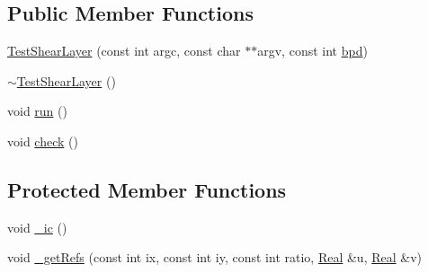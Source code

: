 \subsection*{Public Member Functions}
\begin{DoxyCompactItemize}
\item 
\hyperlink{class_test_shear_layer_abbd18fb0fe2ccbfae087969f88d9e298}{Test\+Shear\+Layer} (const int argc, const char $\ast$$\ast$argv, const int \hyperlink{class_test_shear_layer_aa786becaa4125bd36246994a2243359a}{bpd})
\item 
\hyperlink{class_test_shear_layer_a7ba44bb0bed57b11c0ab24911d6e59a0}{$\sim$\+Test\+Shear\+Layer} ()
\item 
void \hyperlink{class_test_shear_layer_a87f2660d386c5929d05d273c8da364b5}{run} ()
\item 
void \hyperlink{class_test_shear_layer_a6dfb988e9681fac674fd366d3de1efea}{check} ()
\end{DoxyCompactItemize}
\subsection*{Protected Member Functions}
\begin{DoxyCompactItemize}
\item 
void \hyperlink{class_test_shear_layer_adad87d4705869cb6bb80fc7c4bf90307}{\+\_\+ic} ()
\item 
void \hyperlink{class_test_shear_layer_a456b851404822229eb9593fb950c01c6}{\+\_\+get\+Refs} (const int ix, const int iy, const int ratio, \hyperlink{_h_d_f5_dumper_8h_a445a5f0e2a34c9d97d69a3c2d1957907}{Real} \&u, \hyperlink{_h_d_f5_dumper_8h_a445a5f0e2a34c9d97d69a3c2d1957907}{Real} \&v)
\end{DoxyCompactItemize}
